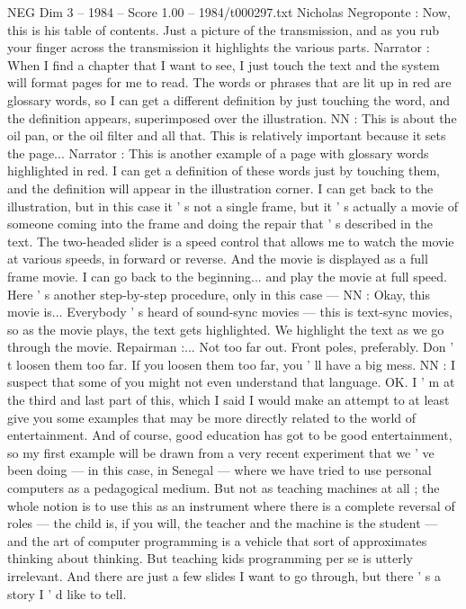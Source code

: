 \begin{textsample}{NEG Dim 3 – 1984 – Score 1.00 – 1984/t000297.txt}
Nicholas Negroponte : Now, this is his table of contents.
Just a picture of the transmission, and as you rub your finger across the transmission it highlights the various parts.
Narrator : When I find a chapter that I want to see, I just touch the text and the system will format pages for me to read.
The words or phrases that are lit up in red are glossary words, so I can get a different definition by just touching the word, and the definition appears, superimposed over the illustration.
NN : This is about the oil pan, or the oil filter and all that.
This is relatively important because it sets the page...
Narrator : This is another example of a page with glossary words highlighted in red.
I can get a definition of these words just by touching them, and the definition will appear in the illustration corner.
I can get back to the illustration, but in this case it ' s not a single frame, but it ' s actually a movie of someone coming into the frame and doing the repair that ' s described in the text.
The two-headed slider is a speed control that allows me to watch the movie at various speeds, in forward or reverse.
And the movie is displayed as a full frame movie.
I can go back to the beginning... and play the movie at full speed.
Here ' s another step-by-step procedure, only in this case — NN : Okay, this movie is...
Everybody ' s heard of sound-sync movies — this is text-sync movies, so as the movie plays, the text gets highlighted.
We highlight the text as we go through the movie.
Repairman :...
Not too far out.
Front poles, preferably.
Don ' t loosen them too far.
If you loosen them too far, you ' ll have a big mess.
NN : I suspect that some of you might not even understand that language.
OK.
I ' m at the third and last part of this, which I said I would make an attempt to at least give you some examples that may be more directly related to the world of entertainment.
And of course, good education has got to be good entertainment, so my first example will be drawn from a very recent experiment that we ' ve been doing — in this case, in Senegal — where we have tried to use personal computers as a pedagogical medium.
But not as teaching machines at all ; the whole notion is to use this as an instrument where there is a complete reversal of roles — the child is, if you will, the teacher and the machine is the student — and the art of computer programming is a vehicle that sort of approximates thinking about thinking.
But teaching kids programming per se is utterly irrelevant.
And there are just a few slides I want to go through, but there ' s a story I ' d like to tell.

\end{textsample}
